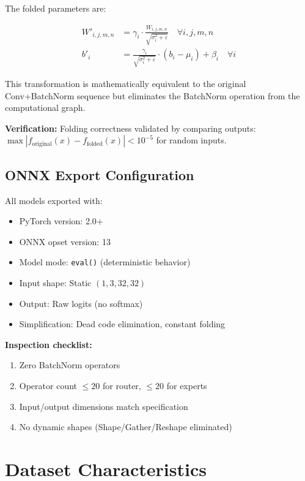 \documentclass[11pt,a4paper]{article}
\begin{document}
The folded parameters are:

\begin{align}
W'_{i,j,m,n} &= \gamma_i \cdot \frac{W_{i,j,m,n}}{\sqrt{\sigma^2_i + \varepsilon}} \quad \forall i,j,m,n \\
b'_i &= \frac{\gamma_i}{\sqrt{\sigma^2_i + \varepsilon}} \cdot (b_i - \mu_i) + \beta_i \quad \forall i
\end{align}

This transformation is mathematically equivalent to the original Conv+BatchNorm sequence but eliminates the BatchNorm operation from the computational graph.

\textbf{Verification:} Folding correctness validated by comparing outputs: $\max|f_{\text{original}}(x) - f_{\text{folded}}(x)| < 10^{-5}$ for random inputs.

\subsection{ONNX Export Configuration}

All models exported with:
\begin{itemize}
    \item PyTorch version: 2.0+
    \item ONNX opset version: 13
    \item Model mode: \texttt{eval()} (deterministic behavior)
    \item Input shape: Static $(1, 3, 32, 32)$
    \item Output: Raw logits (no softmax)
    \item Simplification: Dead code elimination, constant folding
\end{itemize}

\textbf{Inspection checklist:}
\begin{enumerate}
    \item Zero BatchNorm operators
    \item Operator count $\leq 20$ for router, $\leq 20$ for experts
    \item Input/output dimensions match specification
    \item No dynamic shapes (Shape/Gather/Reshape eliminated)
\end{enumerate}

\section{Dataset Characteristics}
\end{document}
